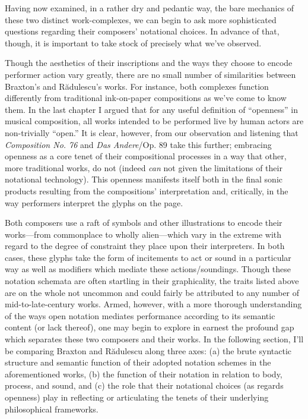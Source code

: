         Having now examined, in a rather dry and pedantic way, the bare mechanics of these two distinct work-complexes, we can begin to ask more sophisticated questions regarding their composers' notational choices. In advance of that, though, it is important to take stock of precisely what we've observed. 
    
        Though the aesthetics of their inscriptions and the ways they choose to encode performer action vary greatly, there are no small number of similarities between Braxton's and R\u{a}dulescu's works. For instance, both complexes function differently from traditional ink-on-paper compositions as we've come to know them. In the last chapter I argued that for any useful definition of ``openness'' in musical composition, all works intended to be performed live by human actors are non-trivially ``open.'' It is clear, however, from our observation and listening that \textit{Composition No. 76} and \textit{Das Andere}/Op. 89 take this further; embracing openness as a core tenet of their compositional processes in a way that other, more traditional works, do not (indeed \textit{can} not given the limitations of their notational technology). This openness manifests itself both in the final sonic products resulting from the compositions' interpretation and, critically, in the way performers interpret the glyphs on the page.
        
        Both composers use a raft of symbols and other illustrations to encode their works---from commonplace to wholly alien---which vary in the extreme with regard to the degree of constraint they place upon their interpreters. In both cases, these glyphs take the form of incitements to act or sound in a particular way as well as modifiers which mediate these actions/soundings. Though these notation schemata are often startling in their graphicality, the traits listed above are on the whole not uncommon and could fairly be attributed to any number of mid-to-late-century works. Armed, however, with a more thorough understanding of the ways open notation mediates performance according to its semantic content (or lack thereof), one may begin to explore in earnest the profound gap which separates these two composers and their works. In the following section, I'll be comparing Braxton and R\u{a}dulescu along three axes: (a) the brute syntactic structure and semantic function of their adopted notation schemes in the aforementioned works, (b) the function of their notation in relation to body, process, and sound, and (c) the role that their notational choices (as regards openness) play in reflecting or articulating the tenets of their underlying philosophical frameworks.

